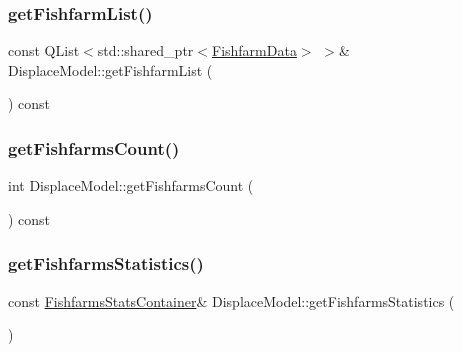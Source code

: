 \subsubsection{\texorpdfstring{getFishfarmList()}{getFishfarmList()}}
{\footnotesize\ttfamily const Q\+List$<$std\+::shared\+\_\+ptr$<$\mbox{\hyperlink{class_fishfarm_data}{Fishfarm\+Data}}$>$ $>$\& Displace\+Model\+::get\+Fishfarm\+List (\begin{DoxyParamCaption}{ }\end{DoxyParamCaption}) const\hspace{0.3cm}{\ttfamily [inline]}}

\mbox{\label{class_displace_model_af52022feb8f8904f7686fe6e82a95718}} 
\subsubsection{\texorpdfstring{getFishfarmsCount()}{getFishfarmsCount()}}
{\footnotesize\ttfamily int Displace\+Model\+::get\+Fishfarms\+Count (\begin{DoxyParamCaption}{ }\end{DoxyParamCaption}) const}

\mbox{\label{class_displace_model_ad36c89ca59516d24824d8704bbf30771}} 
\subsubsection{\texorpdfstring{getFishfarmsStatistics()}{getFishfarmsStatistics()}}
{\footnotesize\ttfamily const \mbox{\hyperlink{class_displace_model_a79e0e2511f2c59cd7d5e8518ffc8ab17}{Fishfarms\+Stats\+Container}}\& Displace\+Model\+::get\+Fishfarms\+Statistics (\begin{DoxyParamCaption}{ }\end{DoxyParamCaption})\hspace{0.3cm}{\ttfamily [inline]}}

\mbox{\label{class_displace_model_a02e92c4e586fb032e89c6d279272c6ea}} 
